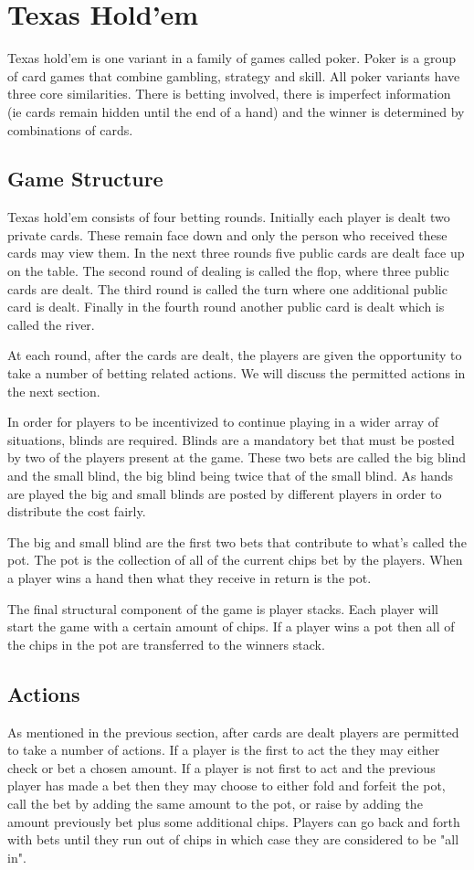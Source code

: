 \section{Texas Hold'em}\label{sec:thIntro}
Texas hold'em is one variant in a family of games called poker.
Poker is a group of card games that combine gambling, strategy and skill.
All poker variants have three core similarities.
There is betting involved, there is imperfect information (ie cards remain hidden until the end of a hand)
and the winner is determined by combinations of cards.

\subsection{Game Structure}\label{subsec:bettingRounds}
Texas hold'em consists of four betting rounds.
Initially each player is dealt two private cards.
These remain face down and only the person who received these cards may view them.
In the next three rounds five public cards are dealt face up on the table.
The second round of dealing is called the flop, where three public cards are dealt.
The third round is called the turn where one additional public card is dealt.
Finally in the fourth round another public card is dealt which is called the river.

At each round, after the cards are dealt, the players are given the opportunity to take a number of betting
related actions.
We will discuss the permitted actions in the next section.

In order for players to be incentivized to continue playing in a wider array of situations, blinds are required.
Blinds are a mandatory bet that must be posted by two of the players present at the game.
These two bets are called the big blind and the small blind, the big blind being twice that of the small blind.
As hands are played the big and small blinds are posted by different players in order to distribute the cost fairly.

The big and small blind are the first two bets that contribute to what's called the pot.
The pot is the collection of all of the current chips bet by the players.
When a player wins a hand then what they receive in return is the pot.

The final structural component of the game is player stacks.
Each player will start the game with a certain amount of chips.
If a player wins a pot then all of the chips in the pot are transferred to the winners stack.

\subsection{Actions}\label{subsec:actions}
As mentioned in the previous section, after cards are dealt players are permitted to take a number of actions.
If a player is the first to act the they may either check or bet a chosen amount.
If a player is not first to act and the previous player has made a bet then they may choose
to either fold and forfeit the pot, call the bet by adding the same amount to the pot, or raise by
adding the amount previously bet plus some additional chips.
Players can go back and forth with bets until they run out of chips in which case they are
considered to be "all in".

